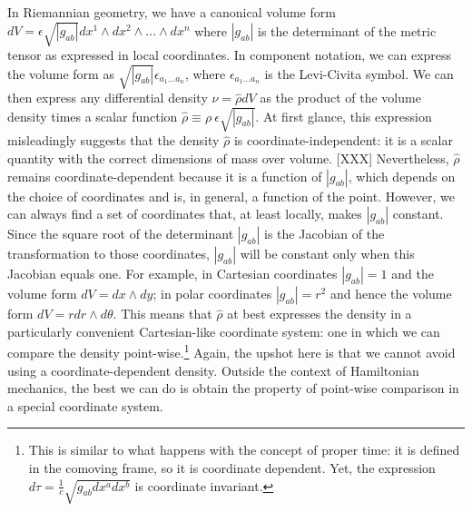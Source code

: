 \documentclass[letterpaper]{article}
\begin{document}
In Riemannian geometry, we have a canonical volume form $dV = \epsilon \sqrt{|g_{ab}|} dx^1 \wedge dx^2 \wedge ... \wedge dx^n$ where $|g_{ab}|$ is the determinant of the metric tensor as expressed in local coordinates. In component notation, we can express the volume form as $\sqrt{|g_{ab}|}\epsilon_{a_1 ... a_n}$, where $\epsilon_{a_1 ... a_n}$ is the Levi-Civita symbol. We can then express any differential density $\nu = \hat{\rho} dV$ as the product of the volume density times a scalar function $\hat{\rho} \equiv \rho \ \epsilon \sqrt{|g_{ab}|}$. At first glance, this expression misleadingly suggests that the density $\hat{\rho}$ is coordinate-independent: it is a scalar quantity with the correct dimensions of mass over volume. [XXX] Nevertheless, $\hat{\rho}$ remains coordinate-dependent because it is a function of $|g_{ab}|$, which depends on the choice of coordinates and is, in general, a function of the point. However, we can always find a set of coordinates that, at least locally, makes $|g_{ab}|$ constant. Since the square root of the determinant $|g_{ab}|$ is the Jacobian of the transformation to those coordinates, $|g_{ab}|$ will be constant only when this Jacobian equals one. For example, in Cartesian coordinates $|g_{ab}| = 1$ and the volume form $dV = dx \wedge dy$; in polar coordinates $|g_{ab}| = r^2$ and hence the volume form $dV = r dr \wedge d\theta$. This means that $\hat{\rho}$ at best expresses the density in a particularly convenient Cartesian-like coordinate system: one in which we can compare the density point-wise.\footnote{This is similar to what happens with the concept of proper time: it is defined in the comoving frame, so it is coordinate dependent. Yet, the expression $d\tau = \frac{1}{c} \sqrt{g_{ab} dx^a dx^b}$ is coordinate invariant.} Again, the upshot here is that we cannot avoid using a coordinate-dependent density. Outside the context of Hamiltonian mechanics, the best we can do is obtain the property of point-wise comparison in a special coordinate system.
\end{document}
